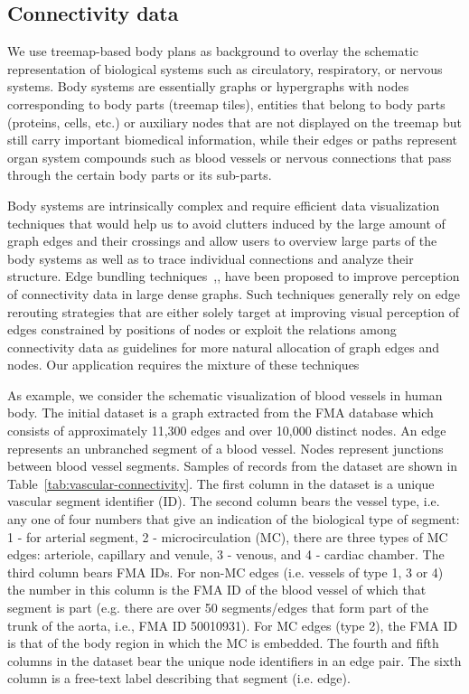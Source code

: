 \subsection{Connectivity data}

We use treemap-based body plans as background to overlay the schematic representation of biological systems such as
circulatory, respiratory, or nervous systems. Body systems are essentially graphs or hypergraphs with nodes corresponding to body parts (treemap tiles), entities that belong to body parts (proteins, cells, etc.) or auxiliary nodes that are not displayed on the treemap but still carry important biomedical information, while their edges or paths represent organ system compounds such as blood vessels or nervous connections that pass through the certain body parts or its sub-parts.

Body systems are intrinsically complex and require efficient data visualization techniques that would help us to avoid clutters induced by the large amount of graph edges and their crossings and allow users to overview large parts of the body systems as well as to trace individual connections and analyze their structure. Edge bundling techniques~\cite{Hol06},\cite{GHN+11},\cite{HET12} have been proposed to improve perception of connectivity data in large dense graphs.
Such techniques generally rely on edge rerouting strategies that are either solely target at improving visual perception of edges constrained by positions of nodes or exploit the relations among connectivity data as guidelines for more natural allocation of graph edges and nodes. Our application requires the mixture of these techniques

As example, we consider the schematic visualization of blood vessels in human body.
The initial dataset is a graph extracted from the FMA database which consists of approximately 11,300 edges and over 10,000 distinct nodes.
An edge represents an unbranched segment of a blood vessel. Nodes represent junctions between blood vessel segments.
Samples of records from the dataset are shown in Table~\ref{tab:vascular-connectivity}. The first column in the dataset is a unique vascular segment identifier (ID). The second column bears the vessel type, i.e. any one of four numbers that give an indication of the biological type of segment:
1 - for arterial segment, 2 - microcirculation (MC), there are three types of MC edges: arteriole, capillary and venule, 3 - venous, and 4 - cardiac chamber.
The third column bears FMA IDs. For non-MC edges (i.e. vessels of type 1, 3 or 4) the number in this column is the FMA ID of the blood vessel of
which that segment is part (e.g. there are over 50 segments/edges that form part of the trunk of the aorta, i.e., FMA ID 50010931). For MC edges (type 2), the FMA ID is that of the body region in which the MC is embedded. The fourth and fifth columns in the dataset bear the unique node identifiers in an edge pair.
The sixth column is a free-text label describing that segment (i.e. edge).

